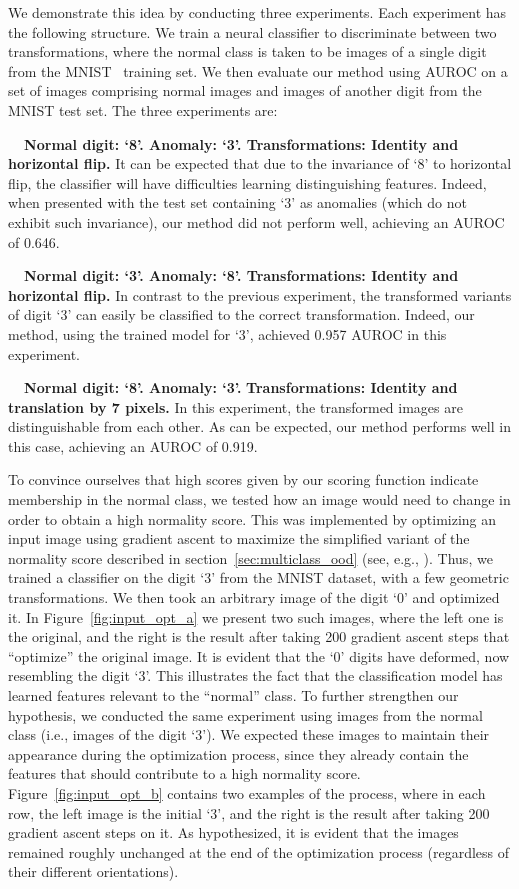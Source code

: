 \documentclass{article}
\begin{document}
	We demonstrate this idea by conducting three experiments. Each experiment has the following structure.
	We train a neural classifier to discriminate between two transformations, where the normal class is taken to be images of a single digit from the MNIST~\cite{lecun2010mnist} training set. We then evaluate our method using AUROC on a set of images comprising normal images and images of another digit from the MNIST test set. The three experiments are:


{\bf \textbullet \ \ Normal digit: `8'. Anomaly: `3'. Transformations: Identity and horizontal flip.} 
     It can be expected that due to the invariance of `8' to horizontal flip, the classifier will have difficulties learning distinguishing features. Indeed, when presented with the test set containing `3' as anomalies (which do not exhibit such invariance), our method did not perform well, achieving an AUROC of 0.646.
     
	 {\bf \textbullet \ \ Normal digit: `3'. Anomaly: `8'. Transformations: Identity and horizontal flip.} 
	 In contrast to the previous experiment, the transformed variants of digit `3' can easily be classified to the correct transformation. Indeed, our method, using the trained model for `3', achieved 0.957 AUROC in this experiment.
	 
	 {\bf \textbullet \ \ Normal digit: `8'. Anomaly: `3'.}
	 {\bf Transformations: Identity and translation by 7 pixels.} In this experiment, the transformed images are distinguishable from each other. As can be expected, our method performs well in this case, achieving an AUROC of 0.919.
	
    
	To convince ourselves that high scores given by our scoring function indicate membership in the normal class, we tested how an image would need to change in order to obtain a high normality score. This was implemented by optimizing an input image using gradient ascent to maximize the simplified variant of the normality score described in section~\ref{sec:multiclass_ood} (see, e.g., \cite{yosinski2015understanding}).
	Thus, we trained a classifier on the digit `3' from the MNIST dataset, with a few geometric transformations. We then took an arbitrary image of the digit `0' and optimized it. 
	In Figure~\ref{fig:input_opt_a} we present two such images, where the left one is the original, and the right is the result after taking 200 gradient ascent steps that ``optimize'' the original image. It is evident that the
	`0' digits have deformed, now resembling the digit `3'. 
	This illustrates the fact that the classification model has learned features relevant to the ``normal'' class. To further strengthen our hypothesis, we conducted the same experiment using images from the normal class (i.e., images of the digit `3'). We expected these images to maintain their appearance during the optimization process, since they already contain the features that should contribute to a high normality score. Figure~\ref{fig:input_opt_b} contains two examples of the process, where in each row, the left image is the initial `3', and the right is the result after taking 200 gradient ascent steps on it. As hypothesized, it is evident that the images remained roughly unchanged at the end of the optimization process (regardless of their different orientations).
\end{document}
